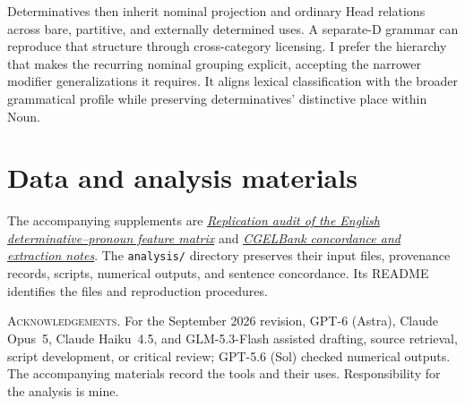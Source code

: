 \documentclass[12pt]{article}
\begin{document}
Determinatives then inherit nominal projection and ordinary Head relations across bare, partitive, and externally determined uses. A separate-D grammar can reproduce that structure through cross-category licensing. I prefer the hierarchy that makes the recurring nominal grouping explicit, accepting the narrower modifier generalizations it requires. It aligns lexical classification with the broader grammatical profile while preserving determinatives' distinctive place within Noun.

\section*{Data and analysis materials}

The accompanying supplements are \href{run:matrix-audit.pdf}{\textit{Replication audit of the English determinative--pronoun feature matrix}} and \href{run:corpus-documentation.pdf}{\textit{CGELBank concordance and extraction notes}}. The \texttt{analysis/} directory preserves their input files, provenance records, scripts, numerical outputs, and sentence concordance. Its README identifies the files and reproduction procedures.

\vspace{0.5\baselineskip}
\noindent\textsc{Acknowledgements.} For the September 2026 revision, GPT-6 (Astra), Claude Opus~5, Claude Haiku~4.5, and GLM-5.3-Flash assisted drafting, source retrieval, script development, or critical review; GPT-5.6 (Sol) checked numerical outputs. The accompanying materials record the tools and their uses. Responsibility for the analysis is mine.

\clearpage
\printbibliography
\end{document}
